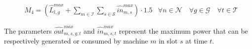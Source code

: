 \documentclass{article}
\newcommand{\cT}{{\mathcal T}}
\newcommand{\cP}{{\mathcal P}}
\newcommand{\cI}{{\mathcal I}}
\newcommand{\cS}{{\mathcal S}}
\newcommand{\cN}{{\mathcal N}}
\newcommand{\cG}{{\mathcal G}}
\begin{document}
{\begin{align}
		& M_{4} = \left( \hat{L}_{l,g}^{max} + \sum_{m \in \cI} \sum_{s \in \cS} \hat{in}_{m,s}^{max} \right) \cdot 1.5 & \forall n \in \cN \quad \forall g \in \cG \quad \forall t \in \cT \label{eq:M4}
		\end{align}	
\begin{comment}
		\begin{align}
		& el_{t}^{grid} \geq (s_{t} - 1) \cdot M_{4, t}& \hspace{8cm} \forall t \in \cT \label{eq:Elgrid_1}\\
		& el_{t}^{grid} \leq s_{t} \cdot M_{3, t}& \hspace{8cm} \forall t \in \cT \label{eq:Elgrid_2}\\
		& El_{t}^{grid} \leq el_{t}^{grid} \cdot \hat{c}_{t}^{el,sold} + (1-s_t) \cdot M_{1, t}& \hspace{5cm} \forall t \in \cT \label{eq:Elgrid_3}\\
		& El_{t}^{grid} \leq el_{t}^{grid} \cdot \hat{c}_{t}^{el,purch} + s_t \cdot M_{2, t}& \hspace{5cm} \forall t \in \cT \label{eq:Elgrid_4}
		\end{align}
		where: 
		\begin{align}
		& M_{1,t} = M_{4,t} \cdot \hat{c}_{t}^{el,purch} \hspace{11cm} \forall t \in \cT \label{eq:M1}\\
		& M_{2,t} = M_{3,t} \cdot \hat{c}_{t}^{el,sold} \hspace{11cm} \forall t \in \cT \label{eq:M2}\\
		& M_{3,t} = \left( \sum_{m \in \cP^+} \sum_{s \in \cS} \hat{el}_{m,s,t}^{max, gen} \right) \cdot 1.5 \hspace{9cm} \forall t \in \cT \label{eq:M3}\\
		& M_{4,t} = \left( \hat{El}_t^{demand} + \sum_{m \in \cP^-} \sum_{s \in \cS} \hat{el}_{m,s,t}^{max, cons} \right) \cdot 1.5 \hspace{7cm} \forall t \in \cT \label{eq:M4}
		\end{align}
\end{comment}
The parameters $\hat{out}_{m,s,g,t}^{max}$ and $\hat{in}_{m,s,t}^{max}$ represent the maximum power that can be respectively generated or consumed by machine $m$ in slot $s$ at time $t$. 


}
\end{document}
